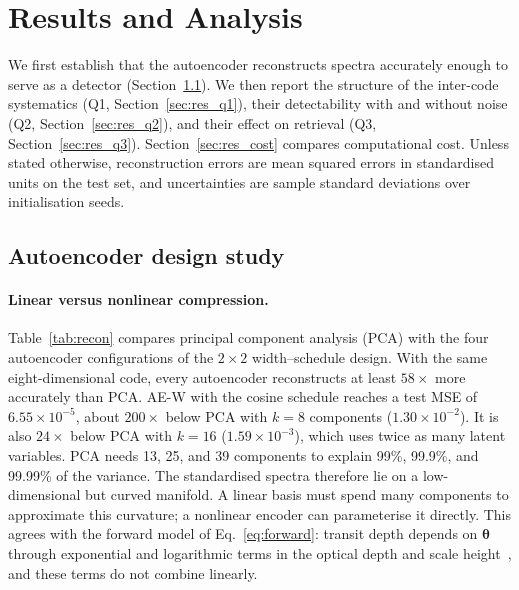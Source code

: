 
\section{Results and Analysis}
\label{sec:results}

We first establish that the autoencoder reconstructs spectra accurately enough to serve as a detector (Section~\ref{sec:res_design}).
We then report the structure of the inter-code systematics (Q1, Section~\ref{sec:res_q1}), their detectability with and without noise (Q2, Section~\ref{sec:res_q2}), and their effect on retrieval (Q3, Section~\ref{sec:res_q3}).
Section~\ref{sec:res_cost} compares computational cost.
Unless stated otherwise, reconstruction errors are mean squared errors in standardised units on the test set, and uncertainties are sample standard deviations over initialisation seeds.

\subsection{Autoencoder design study}
\label{sec:res_design}

\paragraph{Linear versus nonlinear compression.}
Table~\ref{tab:recon} compares principal component analysis (PCA) with the four autoencoder configurations of the $2\times2$ width--schedule design.
With the same eight-dimensional code, every autoencoder reconstructs at least $58\times$ more accurately than PCA.
AE-W with the cosine schedule reaches a test MSE of $6.55\times10^{-5}$, about $200\times$ below PCA with $k=8$ components ($1.30\times10^{-2}$).
It is also $24\times$ below PCA with $k=16$ ($1.59\times10^{-3}$), which uses twice as many latent variables.
PCA needs 13, 25, and 39 components to explain 99\%, 99.9\%, and 99.99\% of the variance.
The standardised spectra therefore lie on a low-dimensional but curved manifold.
A linear basis must spend many components to approximate this curvature; a nonlinear encoder can parameterise it directly.
This agrees with the forward model of Eq.~\eqref{eq:forward}: transit depth depends on $\bm{\theta}$ through exponential and logarithmic terms in the optical depth and scale height~\cite{TODO_benneke_seager_transmission_scaleheight}, and these terms do not combine linearly.

